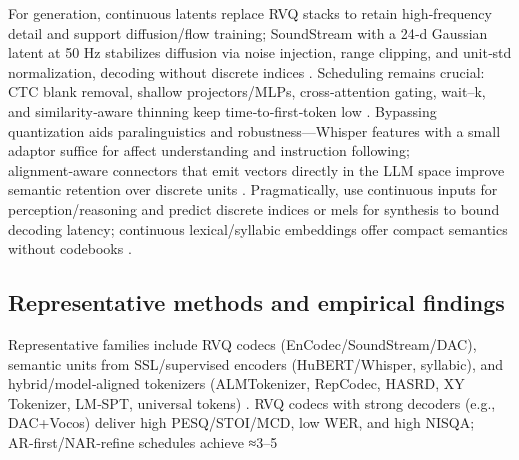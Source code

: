 \documentclass{article}
\begin{document}
For generation, continuous latents replace RVQ stacks to retain high‑frequency detail and support diffusion/flow training; SoundStream with a 24‑d Gaussian latent at 50 Hz stabilizes diffusion via noise injection, range clipping, and unit‑std normalization, decoding without discrete indices \cite{yang2025diffsoundstreamefficientspeechtokenizati}. Scheduling remains crucial: CTC blank removal, shallow projectors/MLPs, cross‑attention gating, wait–k, and similarity‑aware thinning keep time‑to‑first‑token low \cite{tsunoo2024decoderonlyarchitecturespeechrecognition,chen2024bestowefficientstreamablespeechlanguagem,xu2025optimaltransportregularizationspeechtext}. Bypassing quantization aids paralinguistics and robustness—Whisper features with a small adaptor suffice for affect understanding and instruction following; alignment‑aware connectors that emit vectors directly in the LLM space improve semantic retention over discrete units \cite{wang2024blspemotowardsempatheticlargespeechlangu,tan2025ssralignmentawaremodalityconnectorspeech}. Pragmatically, use continuous inputs for perception/reasoning and predict discrete indices or mels for synthesis to bound decoding latency; continuous lexical/syllabic embeddings offer compact semantics without codebooks \cite{wang2024c3llmconditionalmultimodalcontentgenerat,yang2025diffsoundstreamefficientspeechtokenizati,tsunoo2024decoderonlyarchitecturespeechrecognition}.

\subsection{Representative methods and empirical findings} \label{subsec:Representative methods and empirical findings}
Representative families include RVQ codecs (EnCodec/SoundStream/DAC), semantic units from SSL/supervised encoders (HuBERT/Whisper, syllabic), and hybrid/model‑aligned tokenizers (ALMTokenizer, RepCodec, HASRD, XY Tokenizer, LM‑SPT, universal tokens) \cite{fily2024establishingdegreesclosenessbetweenaudio,zhang2025impactframeratesspeechtokenizercasestudy,maimon2025salmonsuiteacousticlanguagemodelevaluati}. RVQ codecs with strong decoders (e.g., DAC+Vocos) deliver high PESQ/STOI/MCD, low WER, and high NISQA; AR‑first/NAR‑refine schedules achieve ≈3–5%
\end{document}
